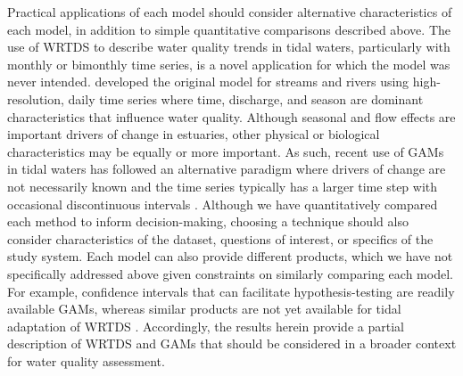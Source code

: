 \documentclass[letterpaper,12pt,oneside]{article}\usepackage[]{graphicx}\usepackage[]{color}
\begin{document}
Practical applications of each model should consider alternative characteristics of each model, in addition to simple quantitative comparisons described above.  The use of \ac{WRTDS} to describe water quality trends in tidal waters, particularly with monthly or bimonthly time series, is a novel application for which the model was never intended.  \cite{Hirsch10} developed the original model for streams and rivers using high-resolution, daily time series where time, discharge, and season are dominant characteristics that influence water quality.  Although seasonal and flow effects are important drivers of change in estuaries, other physical or biological characteristics may be equally or more important.  As such, recent use of \acp{GAM} in tidal waters has followed an alternative paradigm where drivers of change are not necessarily known and the time series typically has a larger time step with occasional discontinuous intervals \citep[E. S. Perry, personal communication,][]{Harding15}.  Although we have quantitatively compared each method to inform decision-making, choosing a technique should also consider characteristics of the dataset, questions of interest, or specifics of the study system.  Each model can also provide different products, which we have not specifically addressed above given constraints on similarly comparing each model.  For example, confidence intervals that can facilitate hypothesis-testing are readily available \acp{GAM}, whereas similar products are not yet available for tidal adaptation of \ac{WRTDS} \cite[but see][]{Hirsch15}.  Accordingly, the results herein provide a partial description of \ac{WRTDS} and \acp{GAM} that should be considered in a broader context for water quality assessment.

\clearpage
\begin{singlespace}


\end{singlespace}
\clearpage

\end{document}
